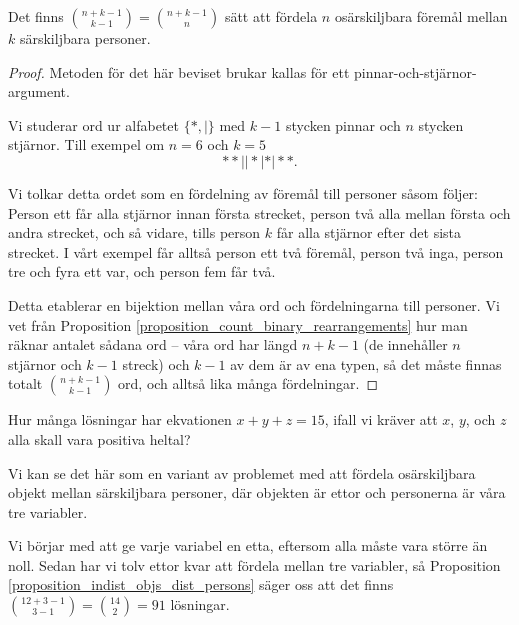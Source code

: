 \documentclass[nobib]{tufte-handout}
\begin{document}
\begin{proposition}\label{proposition_indist_objs_dist_persons}
  Det finns $\binom{n+k-1}{k-1} = \binom{n+k-1}{n}$ sätt att fördela $n$ osärskiljbara föremål mellan $k$ särskiljbara personer.

  \begin{proof}
    Metoden för det här beviset brukar kallas för ett pinnar-och-stjärnor-argument.

    Vi studerar ord ur alfabetet $\{*,|\}$ med $k-1$ stycken pinnar och $n$ stycken stjärnor. Till exempel om $n=6$ och $k=5$
    $$**||*|*|**.$$

    Vi tolkar detta ordet som en fördelning av föremål till personer såsom följer: Person ett får alla  stjärnor innan första strecket, person två alla mellan första och andra strecket, och så vidare, tills person $k$ får alla stjärnor efter det sista strecket. I vårt exempel får alltså person ett två föremål, person två inga, person tre och fyra ett var, och person fem får två.

    Detta etablerar en bijektion mellan våra ord och fördelningarna till personer. Vi vet från Proposition \ref{proposition_count_binary_rearrangements} hur man räknar antalet sådana ord -- våra ord har längd $n + k -1$ (de innehåller $n$ stjärnor och $k-1$ streck) och $k-1$ av dem är av ena typen, så det måste finnas totalt $\binom{n + k - 1}{k - 1}$ ord, och alltså lika många fördelningar.
  \end{proof}
\end{proposition}

\begin{example}
  Hur många lösningar har ekvationen $x + y + z = 15$, ifall vi kräver att $x$, $y$, och $z$ alla skall vara positiva heltal?

  Vi kan se det här som en variant av problemet med att fördela osärskiljbara objekt mellan särskiljbara personer, där objekten är ettor och personerna är våra tre variabler. 
  
  Vi börjar med att ge varje variabel en etta, eftersom alla måste vara större än noll. Sedan har vi tolv ettor kvar att fördela mellan tre variabler, så Proposition \ref{proposition_indist_objs_dist_persons} säger oss att det finns $\binom{12 + 3 -1}{3 - 1} = \binom{14}{2} = 91$ lösningar.
\end{example}
\end{document}
